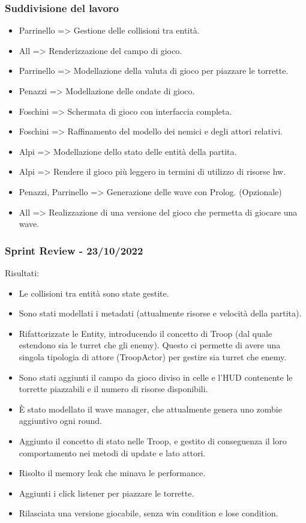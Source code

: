 \subsubsection*{Suddivisione del lavoro}
\begin{itemize}
    \item Parrinello => Gestione delle collisioni tra entità.
    \item All => Renderizzazione del campo di gioco.
    \item Parrinello => Modellazione della valuta di gioco per piazzare le torrette.
    \item Penazzi => Modellazione delle ondate di gioco.
    \item Foschini => Schermata di gioco con interfaccia completa.
    \item Foschini => Raffinamento del modello dei nemici e degli attori relativi.
    \item Alpi => Modellazione dello stato delle entità della partita.
    \item Alpi => Rendere il gioco più leggero in termini di utilizzo di risorse hw.
    \item Penazzi, Parrinello => Generazione delle wave con Prolog. (Opzionale)
    \item All => Realizzazione di una versione del gioco che permetta di giocare una wave.
\end{itemize}

\subsubsection{Sprint Review - 23/10/2022}
Risultati:
\begin{itemize}
  \item Le collisioni tra entità sono state gestite.
  \item Sono stati modellati i metadati (attualmente risorse e velocità della partita).
  \item Rifattorizzate le Entity, introducendo il concetto di Troop (dal quale estendono sia le turret che gli enemy).
        Questo ci permette di avere una singola tipologia di attore (TroopActor) per gestire sia turret che enemy.
  \item Sono stati aggiunti il campo da gioco diviso in celle e l'HUD contenente le torrette piazzabili e il numero di risorse disponibili.
  \item È stato modellato il wave manager, che attualmente genera uno zombie aggiuntivo ogni round.
  \item Aggiunto il concetto di stato nelle Troop, e gestito di conseguenza il loro comportamento nei metodi di update e lato attori.
  \item Risolto il memory leak che minava le performance.
  \item Aggiunti i click listener per piazzare le torrette.
  \item Rilasciata una versione giocabile, senza win condition e lose condition.
\end{itemize}

